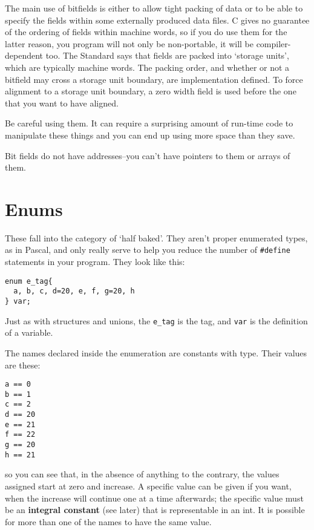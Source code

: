   The main use of bitfields is either to allow tight packing of data or to
   be able to specify the fields within some externally produced data files.
   C gives no guarantee of the ordering of fields within machine words, so if
   you do use them for the latter reason, you program will not only be
   non-portable, it will be compiler-dependent too. The Standard says that
   fields are packed into `storage units', which are typically machine
   words. The packing order, and whether or not a bitfield may cross a storage
   unit boundary, are implementation defined. To force alignment to a storage
   unit boundary, a zero width field is used before the one that you want to
   have aligned.


  Be careful using them. It can require a surprising amount of run-time code
   to manipulate these things and you can end up using more space than they
   save.


  Bit fields do not have addresses--you can't have pointers to them or
   arrays of them.


 
        \section{Enums}
        

  

  These fall into the category of `half baked'. They aren't proper
   enumerated types, as in Pascal, and only really serve to help you reduce the
   number of \texttt{\#define} statements in your program. They look like
   this:


  \begin{Verbatim}
enum e_tag{
  a, b, c, d=20, e, f, g=20, h
} var;
\end{Verbatim}

  Just as with structures and unions, the \texttt{e\_tag} is the tag, and
   \texttt{var} is the definition of a variable.


  The names declared inside the enumeration are constants with
   \kint{} type. Their values are these:


  \begin{Verbatim}
a == 0
b == 1
c == 2
d == 20
e == 21
f == 22
g == 20
h == 21
\end{Verbatim}

  so you can see that, in the absence of anything to the contrary, the
   values assigned start at zero and increase. A specific value can be given if
   you want, when the increase will continue one at a time afterwards; the
   specific value must be an \textbf{integral constant} (see later) that is
   representable in an int. It is possible for more than one of the names to
   have the same value.


